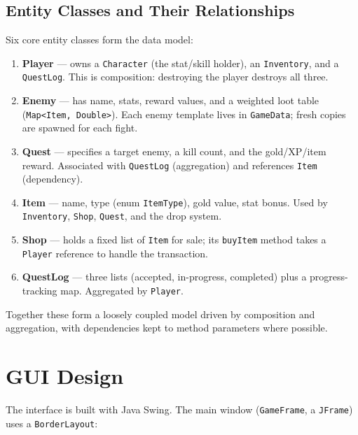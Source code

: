 \documentclass[12pt,a4paper]{article}
\begin{document}
\subsection*{Entity Classes and Their Relationships}

Six core entity classes form the data model:
\begin{enumerate}[leftmargin=*]
    \item \textbf{Player} --- owns a \texttt{Character} (the stat/skill holder), an \texttt{Inventory}, and a \texttt{QuestLog}. This is composition: destroying the player destroys all three.
    \item \textbf{Enemy} --- has name, stats, reward values, and a weighted loot table (\texttt{Map<Item, Double>}). Each enemy template lives in \texttt{GameData}; fresh copies are spawned for each fight.
    \item \textbf{Quest} --- specifies a target enemy, a kill count, and the gold/XP/item reward. Associated with \texttt{QuestLog} (aggregation) and references \texttt{Item} (dependency).
    \item \textbf{Item} --- name, type (enum \texttt{ItemType}), gold value, stat bonus. Used by \texttt{Inventory}, \texttt{Shop}, \texttt{Quest}, and the drop system.
    \item \textbf{Shop} --- holds a fixed list of \texttt{Item} for sale; its \texttt{buyItem} method takes a \texttt{Player} reference to handle the transaction.
    \item \textbf{QuestLog} --- three lists (accepted, in-progress, completed) plus a progress-tracking map. Aggregated by \texttt{Player}.
\end{enumerate}
Together these form a loosely coupled model driven by composition and aggregation, with dependencies kept to method parameters where possible.

\section{GUI Design}

The interface is built with Java Swing. The main window (\texttt{GameFrame}, a \texttt{JFrame}) uses a \texttt{BorderLayout}:
\end{document}
